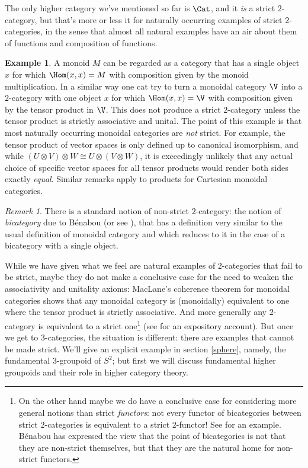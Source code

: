 \documentclass[12pt]{amsart}
\theoremstyle{definition} \newtheorem{definition}[theorem]{Definition}
\newtheorem{example}[theorem]{Example}
\theoremstyle{remark} \newtheorem{remark}[theorem]{Remark}
\numberwithin{equation}{section}
\begin{document}
The only higher category we've mentioned so far is $\Cat$, and it
\emph{is} a strict $2$-category, but that's more or less it for
naturally occurring examples of strict $2$-categories, in the sense
that almost all natural examples have an air about them of functions
and composition of functions.

\begin{example} A monoid $M$ can be regarded as a category that has a
single object $x$ for which $\Hom(x,x) = M$ with composition given by
the monoid multiplication. In a similar way one cat try to turn a
monoidal category $\V$ into a $2$-category with one object $x$ for
which $\Hom(x,x) = \V$ with composition given by the tensor product in
$\V$. This does not produce a strict $2$-category unless the tensor
product is strictly associative and unital. The point of this example
is that most naturally occurring monoidal categories are \emph{not}
strict. For example, the tensor product of vector spaces is only
defined up to canonical isomorphism, and while $(U \otimes V) \otimes
W \cong U \otimes (V \otimes W)$, it is exceedingly unlikely that any
actual choice of specific vector spaces for all tensor products would
render both sides exactly \emph{equal}. Similar remarks apply to
products for Cartesian monoidal categories. \end{example}

\begin{remark} There is a standard notion of non-strict $2$-category: the
notion of \emph{bicategory} due to B\'{e}nabou \cite{Benabou} (or see
\cite{Lack}), that has a definition very similar to the usual
definition of monoidal category and which reduces to it in the case of
a bicategory with a single object. \end{remark}

While we have given what we feel are natural examples of
$2$-categories that fail to be strict, maybe they do not make a
conclusive case for the need to weaken the associativity and unitality
axioms: MacLane's coherence theorem for monoidal categories shows
that any monoidal category is (monoidally) equivalent to one where the
tensor product is strictly associative. And more generally
any $2$-category is equivalent to a strict one\footnote{On the
other hand maybe we do have a conclusive case for considering more
general notions than strict \emph{functors}: not every functor of
bicategories between strict $2$-categories is equivalent to a strict
$2$-functor! See \cite[Lemma 2]{LackTri} for an example. B\'{e}nabou
has expressed the view that the point of bicategories is not that they
are non-strict themselves, but that they are the natural home for
non-strict functors.} (see \cite{LeinsterBicat} for an expository account).
But once we get to $3$-categories, the situation is different: there are
examples that cannot be made strict. We'll give an explicit example in
section \ref{sphere}, namely, the fundamental $3$-groupoid of $S^2$;
but first we will discuss fundamental higher groupoids and their role
in higher category theory.
\end{document}
